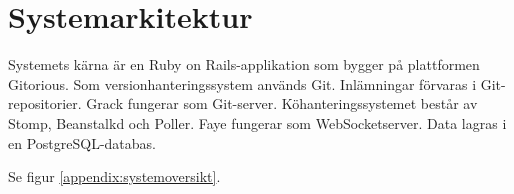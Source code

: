 \section{Systemarkitektur}
Systemets kärna är en Ruby on Rails-applikation som bygger på plattformen Gitorious. Som versionhanteringssystem används Git. Inlämningar förvaras i Git-repositorier. Grack fungerar som Git-server. Köhanteringssystemet består av Stomp, Beanstalkd och Poller. Faye fungerar som WebSocketserver. Data lagras i en PostgreSQL-databas.

Se figur \ref{appendix:systemoversikt}.
